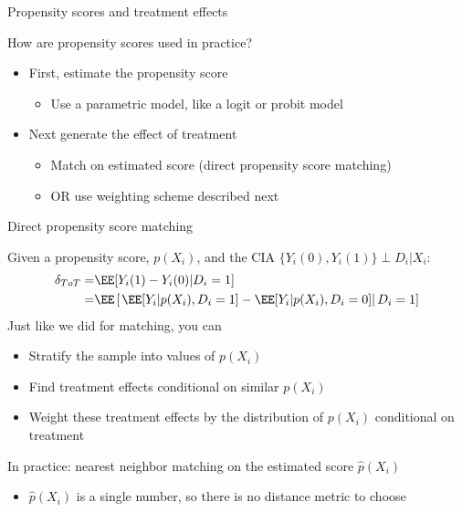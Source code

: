 \documentclass[compress, 8pt]{beamer}
\begin{document}
\begin{frame}{Propensity scores and treatment effects}

How are propensity scores used in practice?
\begin{itemize}
    \item First, estimate the propensity score
    \begin{itemize}
        \item Use a parametric model, like a logit or probit model
    \end{itemize}
    \item Next generate the effect of treatment
    \begin{itemize}
        \item Match on estimated score (direct propensity score matching)
        \item OR use weighting scheme described next
    \end{itemize}
\end{itemize}

\end{frame}

\begin{frame}{Direct propensity score matching}

Given a propensity score, $p(X_i)$, and the CIA $\{Y_i(0), Y_i(1)\} \perp D_i \vert X_i$:
\begin{align*}
    \delta_{ToT} =& \EE [Y_i(1) - Y_i(0) \vert D_i = 1] \\
    =& \EE \left[ \left.
        \EE [Y_i \vert p(X_i), D_i = 1]
        - \EE [Y_i\vert p(X_i), D_i = 0]
    \right\vert D_i = 1 \right]
\end{align*}
Just like we did for matching, you can
\begin{itemize}
    \item Stratify the sample into values of $p(X_i)$
    \item Find treatment effects conditional on similar $p(X_i)$
    \item Weight these treatment effects by the distribution of $p(X_i)$ conditional on treatment
\end{itemize}
In practice: nearest neighbor matching on the estimated score $\hat{p}(X_i)$
\begin{itemize}
    \item $\hat{p}(X_i)$ is a single number, so there is no distance metric to choose
\end{itemize}

\end{frame}
\end{document}
